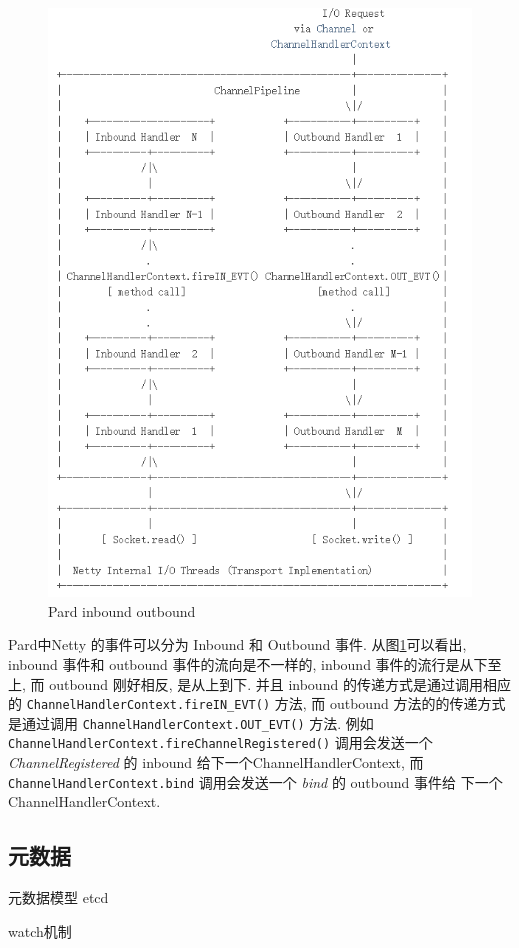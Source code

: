 \documentclass[a4paper, 12pt]{ctexart}
\begin{document}
\begin{figure}[htbp]
	\centering
	\includegraphics[width=0.7\linewidth]{figure/iobound.png}
	\caption{Pard inbound outbound}
	\label{fig:iobound}
\end{figure}

Pard中Netty 的事件可以分为 Inbound 和 Outbound 事件.
从图\ref{fig:iobound}可以看出, inbound 事件和 outbound 事件的流向是不一样的, inbound 事件的流行是从下至上, 而 outbound 刚好相反, 是从上到下. 并且 inbound 的传递方式是通过调用相应的 \lstinline|ChannelHandlerContext.fireIN_EVT()| 方法, 而 outbound 方法的的传递方式是通过调用 \lstinline|ChannelHandlerContext.OUT_EVT()| 方法. 例如 \lstinline|ChannelHandlerContext.fireChannelRegistered()| 调用会发送一个 \textit{ChannelRegistered} 的 inbound 给下一个ChannelHandlerContext, 而 \lstinline|ChannelHandlerContext.bind| 调用会发送一个 \textit{bind} 的 outbound 事件给 下一个 ChannelHandlerContext.







\subsection{元数据}
元数据模型  etcd   


watch机制
\end{document}
